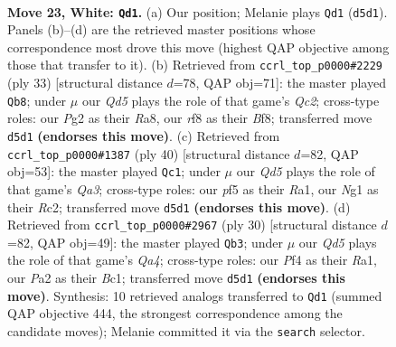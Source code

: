\documentclass[11pt]{article}
\begin{document}
\clearpage

\begin{figure}[p]\centering
\begin{subfigure}{0.46\textwidth}\centering
\resizebox{\linewidth}{!}{%
\newchessgame
\chessboard[
  setfen={1nb1qrk1/1r3ppp/8/3QPp2/p1p2P2/6K1/PPP3PP/R4BNR w - - 0 23},
  showmover=false,
  pgfstyle=straightmove, color=movearrow, markmove={d5-d1}
]}
\caption{}
\end{subfigure}\hfill
\begin{subfigure}{0.46\textwidth}\centering
\resizebox{\linewidth}{!}{%
\newchessgame
\chessboard[
  setfen={r3kb1r/2q2ppp/p3p3/3pP3/bp1Q1B2/8/PP2BPPP/R1R3K1 b kq - 1 17},
  showmover=false,
  pgfstyle=straightmove, color=movearrow, markmove={c7-b8}
]}
\caption{}
\end{subfigure}
\\[4pt]
\begin{subfigure}{0.46\textwidth}\centering
\resizebox{\linewidth}{!}{%
\newchessgame
\chessboard[
  setfen={r3r1k1/1b1nqpp1/7p/pP1p4/2p5/Q3PN2/P1R1BPPP/R5K1 w - - 0 21},
  showmover=false,
  pgfstyle=straightmove, color=movearrow, markmove={a3-c1}
]}
\caption{}
\end{subfigure}\hfill
\begin{subfigure}{0.46\textwidth}\centering
\resizebox{\linewidth}{!}{%
\newchessgame
\chessboard[
  setfen={r3qrk1/pp2bppp/8/5b2/Q3p3/P1N5/1PP2PPP/R1BR2K1 w - - 2 16},
  showmover=false,
  pgfstyle=straightmove, color=movearrow, markmove={a4-b3}
]}
\caption{}
\end{subfigure}
\caption{\textbf{Move 23, White: \texttt{Qd1}.} (a) Our position; Melanie plays \texttt{Qd1} (\texttt{d5d1}). Panels (b)--(d) are the retrieved master positions whose correspondence most drove this move (highest QAP objective among those that transfer to it). (b) Retrieved from \texttt{ccrl\_top\_p0000\#2229} (ply 33) [structural distance $d$=78, QAP obj=71]: the master played \texttt{Qb8}; under $\mu$ our \emph{Qd5} plays the role of that game's \emph{Qc2}; cross-type roles: our \emph{P}g2 as their \emph{R}a8, our \emph{r}f8 as their \emph{B}f8; transferred move \texttt{d5d1} \textbf{(endorses this move)}. (c) Retrieved from \texttt{ccrl\_top\_p0000\#1387} (ply 40) [structural distance $d$=82, QAP obj=53]: the master played \texttt{Qc1}; under $\mu$ our \emph{Qd5} plays the role of that game's \emph{Qa3}; cross-type roles: our \emph{p}f5 as their \emph{R}a1, our \emph{N}g1 as their \emph{R}c2; transferred move \texttt{d5d1} \textbf{(endorses this move)}. (d) Retrieved from \texttt{ccrl\_top\_p0000\#2967} (ply 30) [structural distance $d$=82, QAP obj=49]: the master played \texttt{Qb3}; under $\mu$ our \emph{Qd5} plays the role of that game's \emph{Qa4}; cross-type roles: our \emph{P}f4 as their \emph{R}a1, our \emph{P}a2 as their \emph{B}c1; transferred move \texttt{d5d1} \textbf{(endorses this move)}. Synthesis: 10 retrieved analogs transferred to \texttt{Qd1} (summed QAP objective 444, the strongest correspondence among the candidate moves); Melanie committed it via the \texttt{search} selector.}
\label{fig:thought-m44}
\end{figure}
\end{document}
